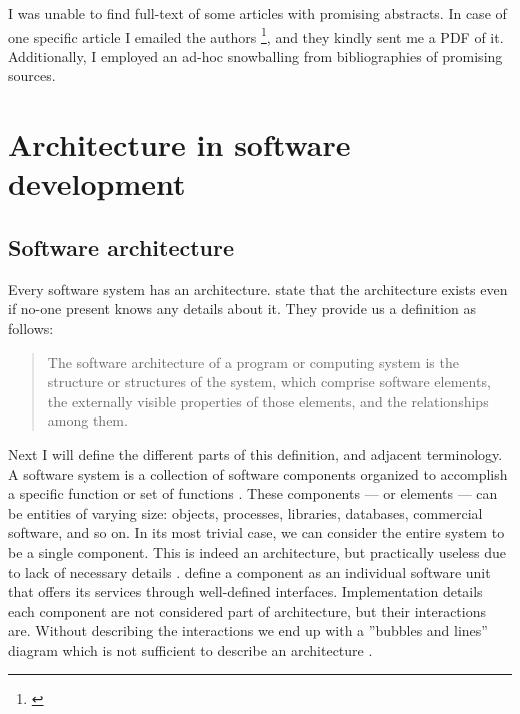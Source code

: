 \documentclass[utf8,english]{gradu3}
\begin{document}
I was unable to find full-text of some articles with promising abstracts.
In case of one specific article I emailed the authors
\footnote{\textcite{Bogner2018}}, and they kindly sent me a PDF of it.
Additionally, I employed an ad-hoc snowballing from bibliographies of promising
sources.

\section{Architecture in software development}

\subsection{Software architecture}

Every software system has an architecture. \textcite[23]{Bass1998} state that
the architecture exists even if no-one present knows any details about it. They
provide us a definition as follows:

\begin{quote}
  The software architecture of a program or computing system is the structure or
  structures of the system, which comprise software elements, the externally
  visible properties of those elements, and the relationships among them.
\end{quote}

Next I will define the different parts of this definition, and adjacent terminology. A software
system is a collection of software components organized to
accomplish a specific function or set of functions \parencite[3]{IEEE42010}.
These components --- or elements --- can be entities of varying size: objects,
processes, libraries, databases, commercial software, and so on. In its most
trivial case, we can consider the entire system to be a single component. This
is indeed an architecture, but practically useless due to lack of necessary
details \parencite[24]{Bass1998}. \textcite[53]{Koskimies2005} define a component as an individual
software unit that offers its services through well-defined interfaces.
Implementation details each component are not considered part of
architecture, but their interactions are. Without describing the interactions we
end up with a ''bubbles and lines'' diagram which is not sufficient to describe
an architecture \parencite[24]{Bass1998}.
\end{document}

